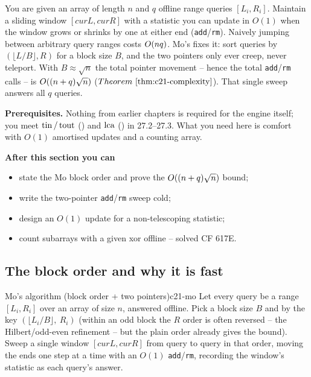\begin{topicintro}
You are given an array of length \(n\) and \(q\) offline range queries
\([L_i,R_i]\).  Maintain a sliding window \([curL,curR]\) with a statistic you can
update in \(O(1)\) when the window grows or shrinks by one at either end
(\texttt{add}/\texttt{rm}).  Naively jumping between arbitrary query ranges costs
\(O(nq)\).  Mo's  fixes it: sort queries by
\((\lfloor L/B\rfloor, R)\) for a block size \(B\), and the two pointers only ever
creep, never teleport.  With \(B\approx\sqrt n\) the total pointer movement -- hence
the total \texttt{add}/\texttt{rm} calls -- is \(O((n+q)\sqrt n)\)
(\(\thmref{c21-complexity}\)).  That single sweep answers all \(q\) queries.

\textbf{Prerequisites.} Nothing from earlier chapters is required for the engine
itself; you meet \(\operatorname{tin}/\operatorname{tout}\) () and \(\operatorname{lca}\) () in 27.2--27.3.
What you need here is comfort with \(O(1)\) amortised updates and a counting array.

\textbf{After this section you can}
\begin{itemize}[nosep]
  \item state the Mo block order and prove the \(O((n+q)\sqrt n)\) bound; \hfill{}
  \item write the two-pointer \texttt{add}/\texttt{rm} sweep cold; \hfill{}
  \item design an \(O(1)\) update for a non-telescoping statistic; \hfill{}
  \item count subarrays with a given xor offline -- solved CF 617E. \hfill{}
\end{itemize}
\end{topicintro}

\subsection{The block order and why it is fast}

\begin{definition}{Mo's algorithm (block order + two pointers)}{c21-mo}
Let every query be a range \([L_i,R_i]\) over an array of size \(n\), answered
offline.  Pick a block size \(B\) and  by the key
\((\lfloor L_i/B\rfloor,\ R_i)\) (within an odd block the \(R\) order is often
reversed -- the Hilbert/odd-even refinement -- but the plain order already gives
the bound).  Sweep a single window \([curL,curR]\) from query to query in that
order, moving the ends one step at a time with an \(O(1)\) \texttt{add}/\texttt{rm},
recording the window's statistic as each query's answer.
\end{definition}

